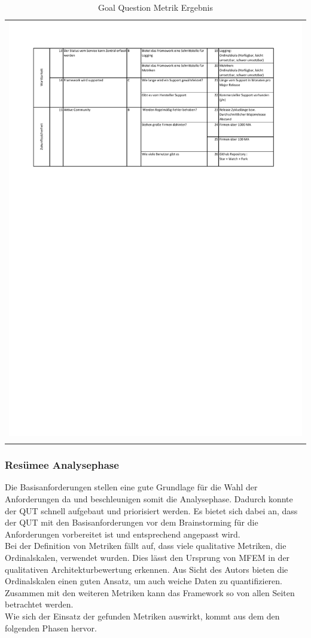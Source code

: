 \begin{longtable}{c}
	\includegraphics[width=\linewidth]{Bilder/GQM2.pdf}	\\
	\caption[Evaluation: Goal Question Metrik Tabelle]{Goal Question Metrik Ergebnis}
	\label{GQM}\\
\end{longtable}
\FloatBarrier

\subsubsection{Resümee Analysephase}
Die Basisanforderungen stellen eine gute Grundlage für die Wahl der Anforderungen da und beschleunigen somit die Analysephase. Dadurch konnte der \acl{QUT} schnell aufgebaut und priorisiert werden. Es bietet sich dabei an, dass der \ac{QUT} mit den Basisanforderungen vor dem Brainstorming für die Anforderungen vorbereitet ist und entsprechend angepasst wird.\\
Bei der Definition von Metriken fällt auf, dass viele qualitative Metriken, die Ordinalskalen, verwendet wurden. Dies lässt den Ursprung von \ac{MFEM} in der qualitativen Architekturbewertung erkennen. Aus Sicht des Autors bieten die Ordinalskalen einen guten Ansatz, um auch weiche Daten zu quantifizieren. Zusammen mit den weiteren Metriken kann das Framework so von allen Seiten betrachtet werden.\\
Wie sich der Einsatz der gefunden Metriken auswirkt, kommt aus dem den folgenden Phasen hervor.


